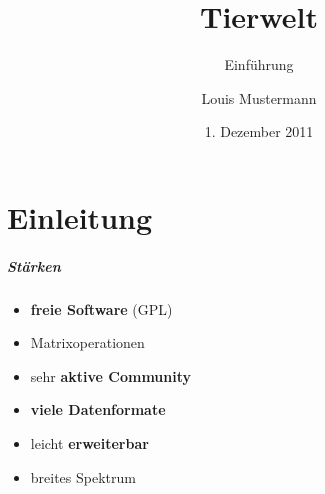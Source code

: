 \documentclass{beamer}
\begin{document}
\subject{Eierlegende Wollmilchsäue}
\title[Eierleger]{Tierwelt}
\subtitle[Einführung]{Einführung}
\date{1. Dezember 2011}
\author{Louis Mustermann}


\begin{frame}
\titlepage
\end{frame}



\part[Einleitung]{Einleitung}

\begin{frame}
\frametitle{Stärken}
\begin{itemize}[<+->]
 \item \textbf{freie Software} (GPL) 
 \item Matrixoperationen 
 \item sehr \textbf{aktive Community}
 \item \textbf{viele Datenformate} 
 \item leicht \textbf{erweiterbar} 
 \item breites Spektrum 
\end{itemize}
\end{frame}
\end{document}
